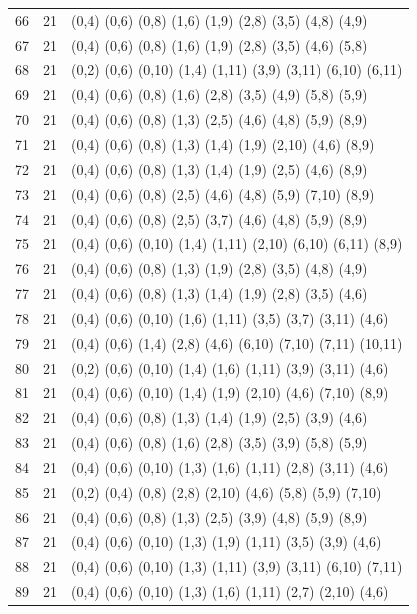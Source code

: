 {\begin{longtable}{lll}
66  & 21 & (0,4) (0,6) (0,8) (1,6) (1,9) (2,8) (3,5) (4,8) (4,9) \\
67  & 21 & (0,4) (0,6) (0,8) (1,6) (1,9) (2,8) (3,5) (4,6) (5,8) \\
68  & 21 & (0,2) (0,6) (0,10) (1,4) (1,11) (3,9) (3,11) (6,10) (6,11) \\
69  & 21 & (0,4) (0,6) (0,8) (1,6) (2,8) (3,5) (4,9) (5,8) (5,9) \\
70  & 21 & (0,4) (0,6) (0,8) (1,3) (2,5) (4,6) (4,8) (5,9) (8,9) \\
71  & 21 & (0,4) (0,6) (0,8) (1,3) (1,4) (1,9) (2,10) (4,6) (8,9) \\
72  & 21 & (0,4) (0,6) (0,8) (1,3) (1,4) (1,9) (2,5) (4,6) (8,9) \\
73  & 21 & (0,4) (0,6) (0,8) (2,5) (4,6) (4,8) (5,9) (7,10) (8,9) \\
74  & 21 & (0,4) (0,6) (0,8) (2,5) (3,7) (4,6) (4,8) (5,9) (8,9) \\
75  & 21 & (0,4) (0,6) (0,10) (1,4) (1,11) (2,10) (6,10) (6,11) (8,9) \\
76  & 21 & (0,4) (0,6) (0,8) (1,3) (1,9) (2,8) (3,5) (4,8) (4,9) \\
77  & 21 & (0,4) (0,6) (0,8) (1,3) (1,4) (1,9) (2,8) (3,5) (4,6) \\
78  & 21 & (0,4) (0,6) (0,10) (1,6) (1,11) (3,5) (3,7) (3,11) (4,6) \\
79  & 21 & (0,4) (0,6) (1,4) (2,8) (4,6) (6,10) (7,10) (7,11) (10,11) \\
80  & 21 & (0,2) (0,6) (0,10) (1,4) (1,6) (1,11) (3,9) (3,11) (4,6) \\
81  & 21 & (0,4) (0,6) (0,10) (1,4) (1,9) (2,10) (4,6) (7,10) (8,9) \\
82  & 21 & (0,4) (0,6) (0,8) (1,3) (1,4) (1,9) (2,5) (3,9) (4,6) \\
83  & 21 & (0,4) (0,6) (0,8) (1,6) (2,8) (3,5) (3,9) (5,8) (5,9) \\
84  & 21 & (0,4) (0,6) (0,10) (1,3) (1,6) (1,11) (2,8) (3,11) (4,6) \\
85  & 21 & (0,2) (0,4) (0,8) (2,8) (2,10) (4,6) (5,8) (5,9) (7,10) \\
86  & 21 & (0,4) (0,6) (0,8) (1,3) (2,5) (3,9) (4,8) (5,9) (8,9) \\
87  & 21 & (0,4) (0,6) (0,10) (1,3) (1,9) (1,11) (3,5) (3,9) (4,6) \\
88  & 21 & (0,4) (0,6) (0,10) (1,3) (1,11) (3,9) (3,11) (6,10) (7,11) \\
89  & 21 & (0,4) (0,6) (0,10) (1,3) (1,6) (1,11) (2,7) (2,10) (4,6) \\

\end{longtable}}
